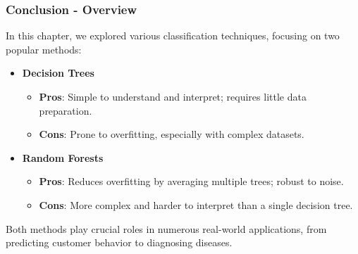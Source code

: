 \documentclass[aspectratio=169]{beamer}
\begin{document}
\begin{frame}[fragile]
    \frametitle{Conclusion - Overview}
    In this chapter, we explored various classification techniques, focusing on two popular methods:
    
    \begin{itemize}
        \item \textbf{Decision Trees}
            \begin{itemize}
                \item \textbf{Pros}: Simple to understand and interpret; requires little data preparation.
                \item \textbf{Cons}: Prone to overfitting, especially with complex datasets.
            \end{itemize}
        \item \textbf{Random Forests}
            \begin{itemize}
                \item \textbf{Pros}: Reduces overfitting by averaging multiple trees; robust to noise.
                \item \textbf{Cons}: More complex and harder to interpret than a single decision tree.
            \end{itemize}
    \end{itemize}

    Both methods play crucial roles in numerous real-world applications, from predicting customer behavior to diagnosing diseases.
\end{frame}
\end{document}
